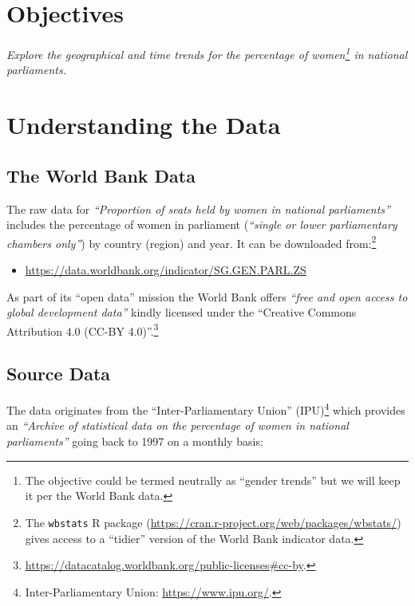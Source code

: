 \documentclass[a4paper,9pt,twocolumn,twoside,]{pinp}
\providecommand{\tightlist}{%
  \setlength{\itemsep}{0pt}\setlength{\parskip}{0pt}}
\begin{document}
\hypertarget{objectives}{%
\section{Objectives}\label{objectives}}

\emph{Explore the geographical and time trends for the percentage of
women\footnote{The objective could be termed neutrally as ``gender
  trends'' but we will keep it per the World Bank data.} in national
parliaments.}

\hypertarget{understanding-the-data}{%
\section{Understanding the Data}\label{understanding-the-data}}

\hypertarget{the-world-bank-data}{%
\subsection{The World Bank Data}\label{the-world-bank-data}}

The raw data for \emph{``Proportion of seats held by women in national
parliaments''} includes the percentage of women in parliament
(\emph{``single or lower parliamentary chambers only''}) by country
(region) and year. It can be downloaded from:\footnote{The
  \texttt{wbstats} R package
  (\url{https://cran.r-project.org/web/packages/wbstats/}) gives access
  to a ``tidier'' version of the World Bank indicator data.}

\begin{itemize}
\tightlist
\item
  \url{https://data.worldbank.org/indicator/SG.GEN.PARL.ZS}
\end{itemize}

As part of its ``open data'' mission the World Bank offers \emph{``free
and open access to global development data''} kindly licensed under the
``Creative Commons Attribution 4.0 (CC-BY 4.0)''.\footnote{\url{https://datacatalog.worldbank.org/public-licenses\#cc-by}.}

\hypertarget{source-data}{%
\subsection{Source Data}\label{source-data}}

The data originates from the ``Inter-Parliamentary Union''
(IPU)\footnote{Inter-Parliamentary Union: \url{https://www.ipu.org/}.}
which provides an \emph{\emph{``Archive of statistical data on the
percentage of women in national parliaments''}} going back to 1997 on a
monthly basis:
\end{document}
